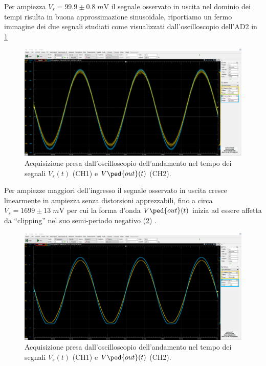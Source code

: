 \documentclass[10pt, a4paper, italian]{article}
\begin{document}
Per ampiezza $V_s = 99.9 \pm 0.8 \; \si{m\V}$ il segnale osservato in uscita
nel dominio dei tempi risulta in buona approssimazione sinusoidale,
riportiamo un fermo immagine dei due segnali studiati come visualizzati
dall'oscilloscopio dell'AD2 in \cref{fig: aloop0.1}
\begin{figure}[htbp]
	\centering
	\includegraphics[scale=0.335]{Aloop100mV}
	\caption{Acquisizione presa dall'oscilloscopio dell'andamento nel tempo dei
	segnali $V_s (t)$ (CH1) e $V\ped{out} (t)$ (CH2). \label{fig: aloop0.1}}
\end{figure}

Per ampiezze maggiori dell'ingresso il segnale osservato in uscita cresce
linearmente in ampiezza senza distorsioni apprezzabili, fino a circa
$V_s = 1699 \pm 13 \; \si{m\V}$ per cui la forma d'onda $V\ped{out} (t)$
inizia ad essere affetta da ``clipping'' nel suo semi-periodo negativo
(\cref{fig: aloop1.7}) .
\begin{figure}[htbp]
	\centering
	\includegraphics[scale=0.335]{Aloop1.7V}
	\caption{Acquisizione presa dall'oscilloscopio dell'andamento nel tempo dei
	segnali $V_s (t)$ (CH1) e $V\ped{out} (t)$ (CH2). \label{fig: aloop1.7}}
\end{figure}
\end{document}
